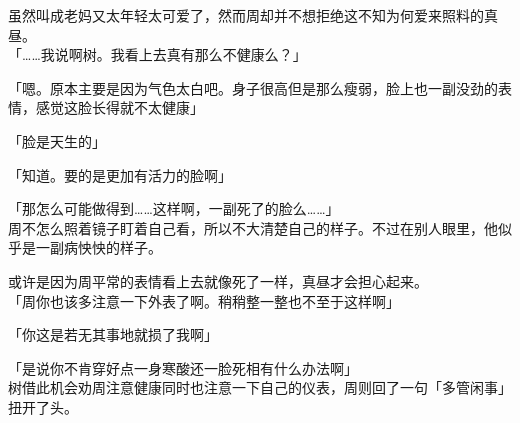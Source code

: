 虽然叫成老妈又太年轻太可爱了，然而周却并不想拒绝这不知为何爱来照料的真昼。\\

「……我说啊树。我看上去真有那么不健康么？」

「嗯。原本主要是因为气色太白吧。身子很高但是那么瘦弱，脸上也一副没劲的表情，感觉这脸长得就不太健康」

「脸是天生的」

「知道。要的是更加有活力的脸啊」

「那怎么可能做得到……这样啊，一副死了的脸么……」\\

周不怎么照着镜子盯着自己看，所以不大清楚自己的样子。不过在别人眼里，他似乎是一副病怏怏的样子。

或许是因为周平常的表情看上去就像死了一样，真昼才会担心起来。\\

「周你也该多注意一下外表了啊。稍稍整一整也不至于这样啊」

「你这是若无其事地就损了我啊」

「是说你不肯穿好点一身寒酸还一脸死相有什么办法啊」\\

树借此机会劝周注意健康同时也注意一下自己的仪表，周则回了一句「多管闲事」扭开了头。
